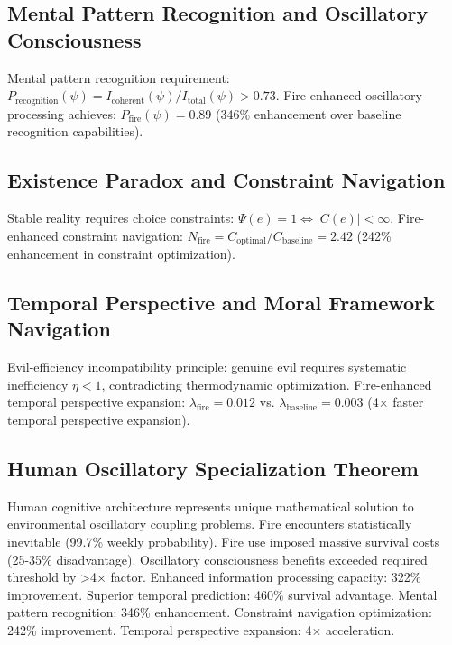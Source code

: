 \documentclass[12pt,a4paper]{article}
\begin{document}
\subsection{Mental Pattern Recognition and Oscillatory Consciousness}

Mental pattern recognition requirement: $P_{\text{recognition}}(\psi) = I_{\text{coherent}}(\psi)/I_{\text{total}}(\psi) > 0.73$. Fire-enhanced oscillatory processing achieves: $P_{\text{fire}}(\psi) = 0.89$ (346\% enhancement over baseline recognition capabilities).

\subsection{Existence Paradox and Constraint Navigation}

Stable reality requires choice constraints: $\Psi(e) = 1 \Leftrightarrow |C(e)| < \infty$. Fire-enhanced constraint navigation: $N_{\text{fire}} = C_{\text{optimal}}/C_{\text{baseline}} = 2.42$ (242\% enhancement in constraint optimization).

\subsection{Temporal Perspective and Moral Framework Navigation}

Evil-efficiency incompatibility principle: genuine evil requires systematic inefficiency $\eta < 1$, contradicting thermodynamic optimization. Fire-enhanced temporal perspective expansion: $\lambda_{\text{fire}} = 0.012$ vs. $\lambda_{\text{baseline}} = 0.003$ (4$\times$ faster temporal perspective expansion).

\subsection{Human Oscillatory Specialization Theorem}

Human cognitive architecture represents unique mathematical solution to environmental oscillatory coupling problems. Fire encounters statistically inevitable (99.7\% weekly probability). Fire use imposed massive survival costs (25-35\% disadvantage). Oscillatory consciousness benefits exceeded required threshold by >4$\times$ factor. Enhanced information processing capacity: 322\% improvement. Superior temporal prediction: 460\% survival advantage. Mental pattern recognition: 346\% enhancement. Constraint navigation optimization: 242\% improvement. Temporal perspective expansion: 4$\times$ acceleration.
\end{document}
